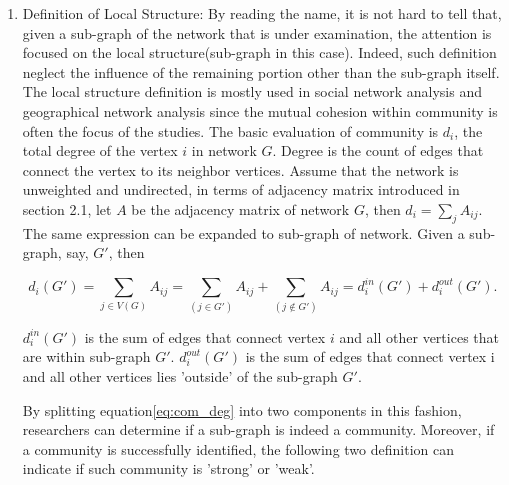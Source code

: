 \documentclass[12pt]{article}
\begin{document}
\bigbreak 

\begin{enumerate}[label=(\roman*)]
\item
    Definition of Local Structure: By reading the name, it is not hard to tell that, given a sub-graph of the network that is under examination, the attention is focused on the local structure(sub-graph in this case). Indeed, such definition neglect the influence of the remaining portion other than the sub-graph itself. The local structure definition is mostly used in social network analysis \cite{17} and geographical network analysis \cite{18} since the mutual cohesion within community is often the focus of the studies. The basic evaluation of community is $d_i$, the total degree of the vertex $i$ in network $G$. Degree is the count of edges that connect the vertex to its neighbor vertices. Assume that the network is unweighted and undirected, in terms of adjacency matrix introduced in section 2.1, let $A$ be the adjacency matrix of network $G$, then $d_i = \sum_{j} A_{ij}$. The same expression can be expanded to sub-graph of network. Given a sub-graph, say, $G'$, then 
    
    \begin{equation}\label{eq:com_deg}
    d_i(G') = \sum_{j \in V(G)} A_{ij} = \sum_{(j\in G')} A_{ij} + \sum_{(j\notin G')} A_{ij} = d_i^{in}(G') + d_i^{out}(G').
    \end{equation}
    
    $d_i^{in}(G')$ is the sum of edges that connect vertex $i$ and all other vertices that are within sub-graph $G'$. $d_i^{out}(G')$ is the sum of edges that connect vertex i and all other vertices lies 'outside' of the sub-graph $G'$. 
     
    \bigbreak
     
    By splitting equation\eqref{eq:com_deg} into two components in this fashion, researchers can determine if a sub-graph is indeed a community. Moreover, if a community is successfully identified, the following two definition can indicate if such community is 'strong' or 'weak'.
    

\end{enumerate}
\end{document}
